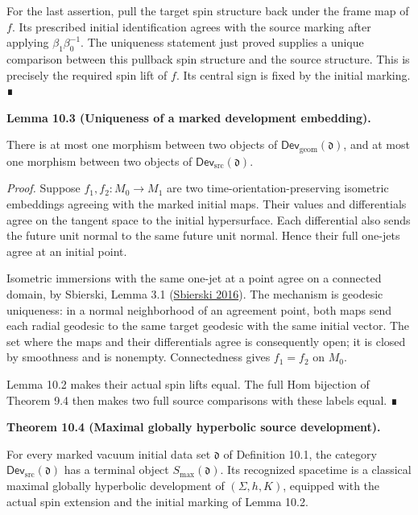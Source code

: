 \documentclass[
  english,
  11pt,
  reqno]{amsart}
\makeatletter
\newcounter{none} %
\newcommand{\pandocstatementheading}[1]{%
  \par\addpenalty{\@beginparpenalty}%
  \addvspace{.5\baselineskip plus .2\baselineskip minus .2\baselineskip}%
  {\normalfont\bfseries #1\par}%
  \nobreak\@afterindenttrue\@afterheading
}
\makeatother
\begin{document}
For the last assertion, pull the target spin structure back under the
frame map of \(f\). Its prescribed initial identification agrees with
the source marking after applying \(\beta_1\beta_0^{-1}\). The
uniqueness statement just proved supplies a unique comparison between
this pullback spin structure and the source structure. This is precisely
the required spin lift of \(f\). Its central sign is fixed by the
initial marking. ∎

\pandocstatementheading{\protect{}\label{lem:global-marked-development-uniqueness}Lemma 10.3 (Uniqueness of a marked development embedding).}

There is at most one morphism between two objects of
\(\mathsf{Dev}_{\mathrm{geom}}(\mathfrak d)\), and at most one morphism
between two objects of \(\mathsf{Dev}_{\mathrm{src}}(\mathfrak d)\).

\emph{Proof.} Suppose \(f_1,f_2:M_0\to M_1\) are two
time-orientation-preserving isometric embeddings agreeing with the
marked initial maps. Their values and differentials agree on the tangent
space to the initial hypersurface. Each differential also sends the
future unit normal to the same future unit normal. Hence their full
one-jets agree at an initial point.

Isometric immersions with the same one-jet at a point agree on a
connected domain, by Sbierski, Lemma 3.1
(\hyperref[ref-Sbierski2016]{Sbierski 2016}). The mechanism is geodesic
uniqueness: in a normal neighborhood of an agreement point, both maps
send each radial geodesic to the same target geodesic with the same
initial vector. The set where the maps and their differentials agree is
consequently open; it is closed by smoothness and is nonempty.
Connectedness gives \(f_1=f_2\) on \(M_0\).

Lemma 10.2 makes their actual spin lifts equal. The full Hom bijection
of Theorem 9.4 then makes two full source comparisons with these labels
equal. ∎

\pandocstatementheading{\protect{}\label{thm:global-maximal-source-development}Theorem 10.4 (Maximal globally hyperbolic source development).}

For every marked vacuum initial data set \(\mathfrak d\) of Definition
10.1, the category \(\mathsf{Dev}_{\mathrm{src}}(\mathfrak d)\) has a
terminal object \(S_{\max}(\mathfrak d)\). Its recognized spacetime is a
classical maximal globally hyperbolic development of \((\Sigma,h,K)\),
equipped with the actual spin extension and the initial marking of Lemma
10.2.
\end{document}
